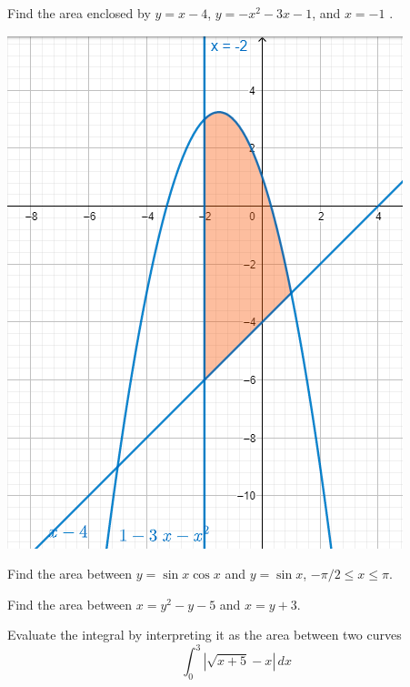 \begin{example}

Find the area enclosed by \(y=x-4\), \(y=-x^2 - 3x - 1\), and \(x= - 1\) .

\includegraphics[scale=0.4]{img/image-20200506104639920.png}

\end{example}
\vspace*{6\baselineskip}


\begin{example}

Find the area between \(y=\sin x\cos x\) and \(y=\sin x\),
\(-\pi/2\le x\le \pi\).

\end{example}
\vspace*{6\baselineskip}

\begin{example}

Find the area between \(x=y^2-y-5\) and \(x=y+3\).

\end{example}
\vspace*{6\baselineskip}


\begin{example}

Evaluate the integral by interpreting it as the area between two curves
\[\int_0^3|\sqrt{x+5}-x|\, dx\]

\end{example}
\vspace*{6\baselineskip}


